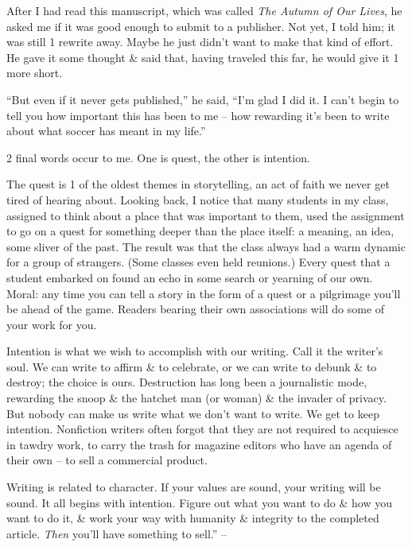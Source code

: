 \documentclass{article}
\numberwithin{equation}{section}
\begin{document}
After I had read this manuscript, which was called \textit{The Autumn of Our Lives}, he asked me if it was good enough to submit to a publisher. Not yet, I told him; it was still 1 rewrite away. Maybe he just didn't want to make that kind of effort. He gave it some thought \& said that, having traveled this far, he would give it 1 more short.

``But even if it never gets published,'' he said, ``I'm glad I did it. I can't begin to tell you how important this has been to me -- how rewarding it's been to write about what soccer has meant in my life.''

2 final words occur to me. One is quest, the other is intention.

The quest is 1 of the oldest themes in storytelling, an act of faith we never get tired of hearing about. Looking back, I notice that many students in my class, assigned to think about a place that was important to them, used the assignment to go on a quest for something deeper than the place itself: a meaning, an idea, some sliver of the past. The result was that the class always had a warm dynamic for a group of strangers. (Some classes even held reunions.) Every quest that a student embarked on found an echo in some search or yearning of our own. Moral: any time you can tell a story in the form of a quest or a pilgrimage you'll be ahead of the game. Readers bearing their own associations will do some of your work for you.

Intention is what we wish to accomplish with our writing. Call it the writer's soul. We can write to affirm \& to celebrate, or we can write to debunk \& to destroy; the choice is ours. Destruction has long been a journalistic mode, rewarding the snoop \& the hatchet man (or woman) \& the invader of privacy. But nobody can make us write what we don't want to write. We get to keep intention. Nonfiction writers often forgot that they are not required to acquiesce in tawdry work, to carry the trash for magazine editors who have an agenda of their own -- to sell a commercial product.

Writing is related to character. If your values are sound, your writing will be sound. It all begins with intention. Figure out what you want to do \& how you want to do it, \& work your way with humanity \& integrity to the completed article. \textit{Then} you'll have something to sell.'' -- \cite[pp. 238--244]{Zinsser2016}

\end{document}
